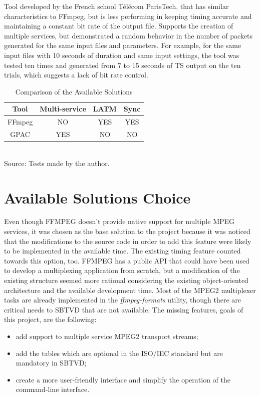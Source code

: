 \documentclass[
	12pt,				%
	openright,			%
	twoside,			%
	a4paper,			%
	brazil,
	french,				%
	english
	]{abntex2}
\begin{document}
Tool developed by the French school Télécom ParisTech, that has similar characteristics to FFmpeg, but is less performing in keeping timing accurate and maintaining a constant bit rate of the output file. Supports the creation of multiple services, but demonstrated a random behavior in the number of packets generated for the same input files and parameters. For example, for the same input files with 10 seconds of duration and same input settings, the tool was tested ten times and generated from 7 to 15 seconds of TS output on the ten trials, which suggests a lack of bit rate control.

\begin{table}[!htpd]
\caption{Comparison of the Available Solutions}
\begin{center}
\begin{tabular}{|c|c|c|c|}
\hline
Tool & Multi-service & LATM & Sync\\
\hline
FFmpeg & NO & YES & YES\\
\hline
GPAC & YES & NO & NO\\
\hline
\end{tabular}
\label{tab_comparison_tools}
\\Source: Tests made by the author.
\end{center}
\end{table}

\section{Available Solutions Choice}

Even though FFMPEG doesn't provide native support for multiple MPEG services, it was chosen as the base solution to the project because it was noticed that the modifications to the source code in order to add this feature were likely to be implemented in the available time. The existing timing feature counted towards this option, too. FFMPEG has a public API that could have been used to develop a multiplexing application from scratch, but a modification of the existing structure seemed more rational considering the existing object-oriented architecture and the available development time. Most of the MPEG2 multiplexer tasks are already implemented in the \textit{ffmpeg-formats} utility, though there are critical needs to SBTVD that are not available. The missing features, goals of this project, are the following:

\begin{itemize}
\item{add support to multiple service MPEG2 transport streams;}
\item{add the tables which are optional in the ISO/IEC standard but are mandatory in SBTVD;}
\item{create a more user-friendly interface and simplify the operation of the command-line interface.}
\end{itemize}
\end{document}
